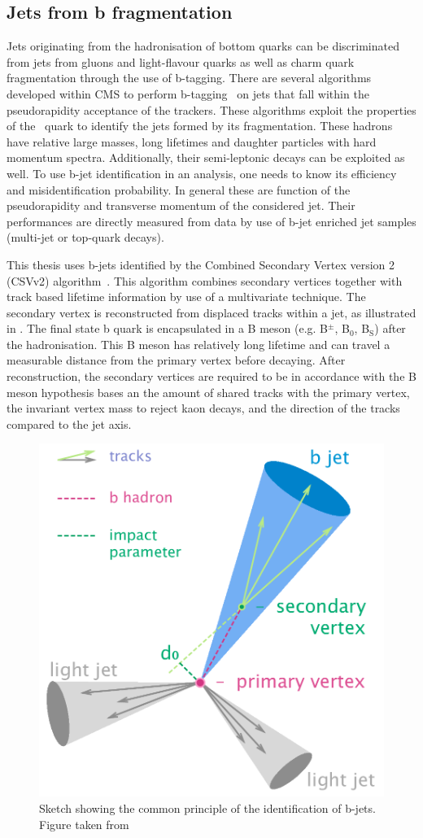 \subsection{Jets from b fragmentation}
\label{sec:BJetID}
Jets originating from the hadronisation of bottom quarks can be discriminated from jets from gluons and light-flavour quarks as well as charm quark fragmentation through the use of b-tagging. There are several algorithms developed within CMS to perform b-tagging~\cite{1748-0221-8-04-P04013,CMS-PAS-BTV-15-001} on jets that fall within the pseudorapidity acceptance of the trackers. These algorithms exploit the properties of the \Pbottom\ quark to identify the jets formed by its fragmentation. These hadrons have relative large masses, long lifetimes and daughter particles with hard momentum spectra. Additionally, their semi-leptonic decays can be exploited as well.  To use b-jet identification in an analysis, one needs to know its efficiency and misidentification probability. In general these are function of the pseudorapidity and transverse momentum of the considered jet. Their performances are directly measured from data by use of b-jet enriched jet samples (multi-jet or top-quark decays). 


This thesis uses b-jets identified by the Combined Secondary Vertex version 2 (CSVv2) algorithm~\cite{1748-0221-8-04-P04013}. This algorithm combines secondary vertices together with track based lifetime information by use of a multivariate technique. The secondary vertex is reconstructed from displaced tracks within a jet, as illustrated in . The final state b quark is encapsulated in a B meson (e.g. B$^{\pm}$, B$_0$, B$_{\mathrm{S}}$) after the hadronisation. This B meson has relatively long lifetime and can travel a measurable distance from the primary vertex before decaying.%
 After reconstruction, the secondary vertices are required to be in accordance with the B meson hypothesis bases an the amount of shared tracks with the primary vertex, the invariant vertex mass to reject kaon decays, and the direction of the tracks compared to the jet axis. 
\begin{figure}[htbp]
	\centering
	\includegraphics[width=.5\linewidth]{4_EventRecoSelect/Figures/B-tagging_diagram}
	\caption{Sketch showing the common principle of the identification of b-jets. Figure taken from \cite{btagjet}}
	\label{fig:btaggingdiagram}
\end{figure}


